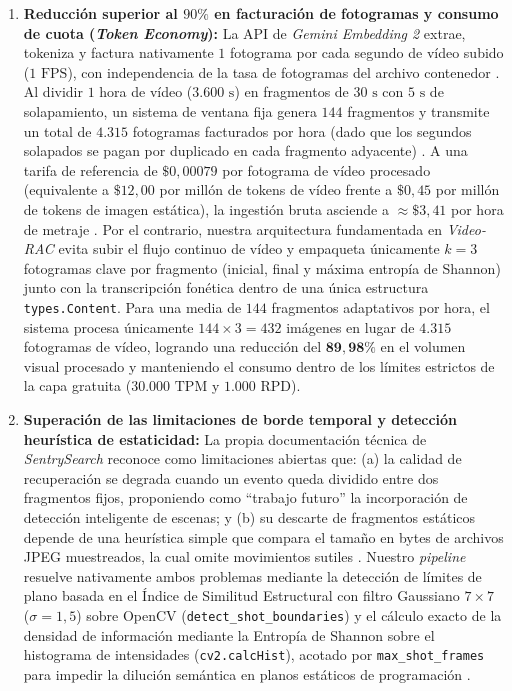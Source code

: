 \begin{enumerate}
    \item \textbf{Reducción superior al $90\%$ en facturación de fotogramas y consumo de cuota (\textit{Token Economy}):}
    La API de \textit{Gemini Embedding 2} extrae, tokeniza y factura nativamente $1$ fotograma por cada segundo de vídeo subido ($1\text{ FPS}$), con independencia de la tasa de fotogramas del archivo contenedor \cite{sentrysearch2026}. %
    Al dividir $1$ hora de vídeo ($3.600\text{ s}$) en fragmentos de $30\text{ s}$ con $5\text{ s}$ de solapamiento, un sistema de ventana fija genera $144$ fragmentos y transmite un total de $4.315$ fotogramas facturados por hora (dado que los segundos solapados se pagan por duplicado en cada fragmento adyacente) \cite{sentrysearch2026}. %
    A una tarifa de referencia de $\$0,00079$ por fotograma de vídeo procesado (equivalente a $\$12,00$ por millón de tokens de vídeo frente a $\$0,45$ por millón de tokens de imagen estática), la ingestión bruta asciende a $\approx \$3,41$ por hora de metraje \cite{sentrysearch2026, gemini_emb2_docs}. %
    Por el contrario, nuestra arquitectura fundamentada en \textit{Video-RAC} \cite{video_rac2025} evita subir el flujo continuo de vídeo y empaqueta únicamente $k = 3$ fotogramas clave por fragmento (inicial, final y máxima entropía de Shannon) junto con la transcripción fonética dentro de una única estructura \texttt{types.Content}. %
    Para una media de $144$ fragmentos adaptativos por hora, el sistema procesa únicamente $144 \times 3 = 432$ imágenes en lugar de $4.315$ fotogramas de vídeo, logrando una reducción del $\mathbf{89,98\%}$ en el volumen visual procesado y manteniendo el consumo dentro de los límites estrictos de la capa gratuita ($30.000\text{ TPM}$ y $1.000\text{ RPD}$). %

    \item \textbf{Superación de las limitaciones de borde temporal y detección heurística de estaticidad:}
    La propia documentación técnica de \textit{SentrySearch} reconoce como limitaciones abiertas que: (a) la calidad de recuperación se degrada cuando un evento queda dividido entre dos fragmentos fijos, proponiendo como ``trabajo futuro'' la incorporación de detección inteligente de escenas; y (b) su descarte de fragmentos estáticos depende de una heurística simple que compara el tamaño en bytes de archivos JPEG muestreados, la cual omite movimientos sutiles \cite{sentrysearch2026}. %
    Nuestro \textit{pipeline} resuelve nativamente ambos problemas mediante la detección de límites de plano basada en el Índice de Similitud Estructural con filtro Gaussiano $7 \times 7$ ($\sigma = 1,5$) sobre OpenCV (\texttt{detect\_shot\_boundaries}) y el cálculo exacto de la densidad de información mediante la Entropía de Shannon sobre el histograma de intensidades (\texttt{cv2.calcHist}), acotado por \texttt{max\_shot\_frames} para impedir la dilución semántica en planos estáticos de programación \cite{video_rac2025}. %


\end{enumerate}

